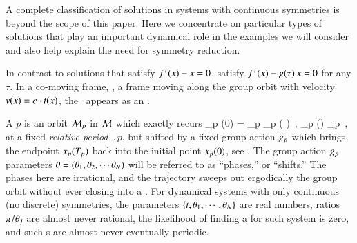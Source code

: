 A complete classification of solutions in systems with continuous symmetries is
beyond the scope of this paper. Here we concentrate on particular types of solutions
that play an important dynamical role in the examples we will consider and also
help explain the need for symmetry reduction.

In contrast to \emph{\eqv} solutions that satisfy
$f^\tau(x) - x = 0$, \emph{\reqva} satisfy $f^\tau(x) -
g( \tau) \, x= 0$ for any $\tau$. In a co-moving frame, \ie, a frame moving
along the group orbit with velocity
$v(x) = c \cdot t(x)$,
the \reqv\ appears as an \eqv.

A {\em \rpo} $p$ is an orbit ${\cal M}_p$ in {\statesp} ${\cal M}$
which exactly recurs
\beq
\ssp_p (0) = \LieEl_p \ssp_p ( )
    \,,\qquad
\ssp_p (\tau) \in \pS_p
    \,,
\label{RPOrelper1}
\eeq
at a fixed {\em relative period} $\period{p}$, but
shifted by a fixed group action ${g_p}$
which brings the endpoint $x_p ({T_{p}} ) $
back into the initial point $x_p (0) $, see .
The group action ${g_p}$ parameters
${\bf \theta} = ({\bf \theta}_1,{\bf \theta}_2,\cdots{\bf \theta}_N)$
will be referred to as ``phases,'' or ``shifts.''
The phases here are irrational, and the trajectory sweeps out
ergodically the group orbit without ever closing into a \po.
For dynamical systems with only continuous (no discrete)
symmetries, the parameters $\{t,{\bf \theta}_1,\cdots,{\bf \theta}_N\}$
are real numbers, ratios $\pi/{\bf \theta}_j$ are almost never
rational, the likelihood of finding a {\po} for such system is
{zero}, and such \rpo s are almost never eventually periodic.

